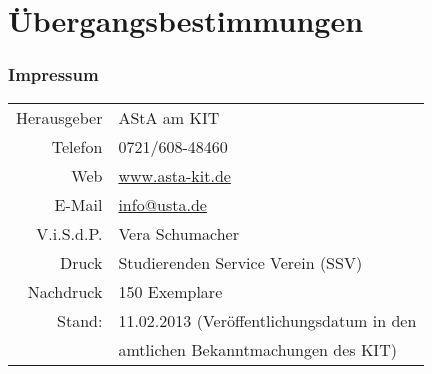 \documentclass[
	a4paper,
	parskip=half,
	numbers=noenddot,
	titlepage,
	DIV=12,
]{scrartcl}
\begin{document}
\part{Übergangsbestimmungen}

\begin{multicols}{2}

\end{multicols}


\vspace*{\fill}
\section*{Impressum}
\begin{tabular}{rl}
	Herausgeber & AStA am KIT \\
	Telefon & 0721/608-48460 \\
	Web & \url{www.asta-kit.de} \\
	E-Mail & \href{mailto:info@usta.de}{info@usta.de}\\
	V.i.S.d.P. & Vera Schumacher\\
	Druck & Studierenden Service Verein (SSV)\\
	Nachdruck & 150 Exemplare\\
	Stand: & 11.02.2013 (Veröffentlichungsdatum in den\\
& amtlichen Bekanntmachungen des KIT)
\end{tabular}
\end{document}
